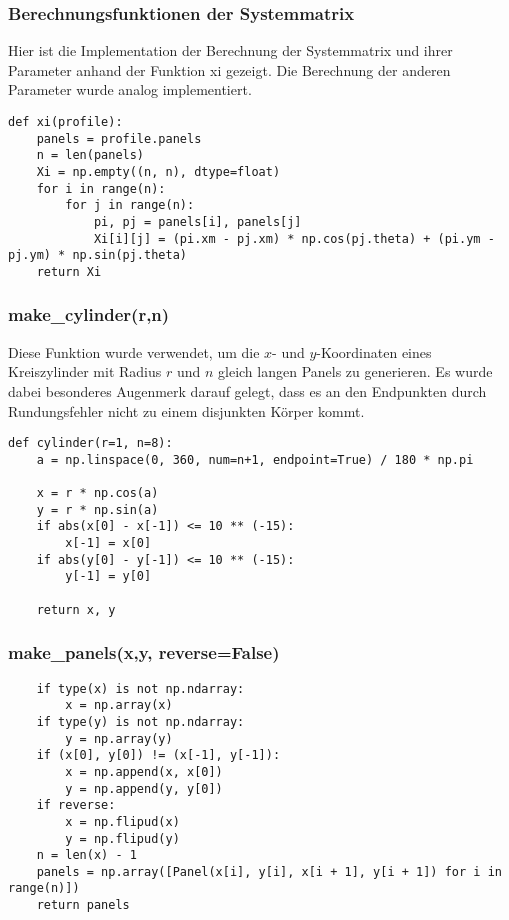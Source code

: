 \subsubsection{Berechnungsfunktionen der Systemmatrix}
Hier ist die Implementation der Berechnung der Systemmatrix und ihrer Parameter anhand der Funktion xi gezeigt. Die Berechnung der anderen Parameter wurde analog implementiert.
\begin{lstlisting}
def xi(profile):
    panels = profile.panels
    n = len(panels)
    Xi = np.empty((n, n), dtype=float)
    for i in range(n):
        for j in range(n):
            pi, pj = panels[i], panels[j]
            Xi[i][j] = (pi.xm - pj.xm) * np.cos(pj.theta) + (pi.ym - pj.ym) * np.sin(pj.theta)
    return Xi
\end{lstlisting}

\subsubsection{make\_cylinder(r,n)}
Diese Funktion wurde verwendet, um die $x$- und $y$-Koordinaten eines Kreiszylinder mit Radius $r$ und $n$ gleich langen Panels zu generieren. Es wurde dabei besonderes Augenmerk darauf gelegt, dass es an den Endpunkten durch Rundungsfehler nicht zu einem disjunkten Körper kommt.
\begin{lstlisting}
def cylinder(r=1, n=8):
    a = np.linspace(0, 360, num=n+1, endpoint=True) / 180 * np.pi

    x = r * np.cos(a)
    y = r * np.sin(a)
    if abs(x[0] - x[-1]) <= 10 ** (-15):
        x[-1] = x[0]
    if abs(y[0] - y[-1]) <= 10 ** (-15):
        y[-1] = y[0]

    return x, y
\end{lstlisting}

\subsubsection{make\_panels(x,y, reverse=False)}
\begin{lstlisting}
    if type(x) is not np.ndarray:
        x = np.array(x)
    if type(y) is not np.ndarray:
        y = np.array(y)
    if (x[0], y[0]) != (x[-1], y[-1]):
        x = np.append(x, x[0])
        y = np.append(y, y[0])
    if reverse:
        x = np.flipud(x)
        y = np.flipud(y)
    n = len(x) - 1
    panels = np.array([Panel(x[i], y[i], x[i + 1], y[i + 1]) for i in range(n)])
    return panels
\end{lstlisting}

